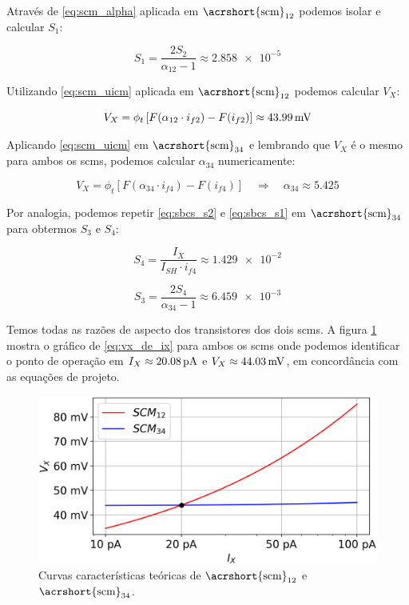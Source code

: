 \documentclass[10pt,a4paper]{extreport}
\newcommand{\?}{\stackrel{?}{=}}
\newcommand{\sis}[2]{\complexnum{#1}\,\si[per-mode=symbol]{#2}}
\newcommand{\mysize}{0.69}
\begin{document}
Através de \eqref{eq:scm_alpha} aplicada em $\text{\acrshort{scm}}_{12}$ podemos isolar e calcular $S_1$:

\begin{equation}
    \label{eq:sbcs_s1}
    S_1=\frac{2S_2}{\alpha_{12}-1}\approx\num{2.858e-5}
\end{equation}

Utilizando \eqref{eq:scm_uicm} aplicada em $\text{\acrshort{scm}}_{12}$ podemos calcular $V_X$:

\begin{equation}
    \label{eq:sbcs_vx}
    V_X=\phi_t\left[F(\alpha_{12}\cdot i_{f2})-F(i_{f2})\right]\approx\sis{43.99}{\milli\volt}
\end{equation}

Aplicando \eqref{eq:scm_uicm} em $\text{\acrshort{scm}}_{34}$ e lembrando que $V_X$ é o mesmo para ambos os \acrshort{scm}s, podemos calcular $\alpha_{34}$ numericamente:

\begin{equation}
    \label{eq:sbcs_a24}
    V_X=\phi_t\left[F(\alpha_{34}\cdot i_{f4})-F(i_{f4})\right]
    \quad\Rightarrow\quad
    \alpha_{34}\approx\num{5.425}
\end{equation}

Por analogia, podemos repetir \eqref{eq:sbcs_s2} e \eqref{eq:sbcs_s1} em $\text{\acrshort{scm}}_{34}$ para obtermos $S_3$ e $S_4$:

\begin{equation}
    \label{eq:sbcs_s4}
    S_4=\frac{I_X}{I_{SH}\cdot i_{f4}}\approx\num{1.429e-2}
\end{equation}

\begin{equation}
    \label{eq:sbcs_s3}
    S_3=\frac{2S_4}{\alpha_{34}-1}\approx\num{6.459e-3}
\end{equation}

Temos todas as razões de aspecto dos transistores dos dois \acrshort{scm}s. A figura \ref{fig:scm_teorico} mostra o gráfico de \eqref{eq:vx_de_ix} para ambos os \acrshort{scm}s onde podemos identificar o ponto de operação em $I_X\approx\sis{20.08}{\pico\ampere}$ e $V_X\approx\sis{44.03}{\milli\volt}$, em concordância com as equações de projeto.

\begin{figure}[htp!]
    \includegraphics[width=\mysize\linewidth]{Imagens/scm_teorico.png}
    \centering
    \caption{Curvas características teóricas de $\text{\acrshort{scm}}_{12}$ e $\text{\acrshort{scm}}_{34}$.}
    \label{fig:scm_teorico}
\end{figure}
\end{document}
